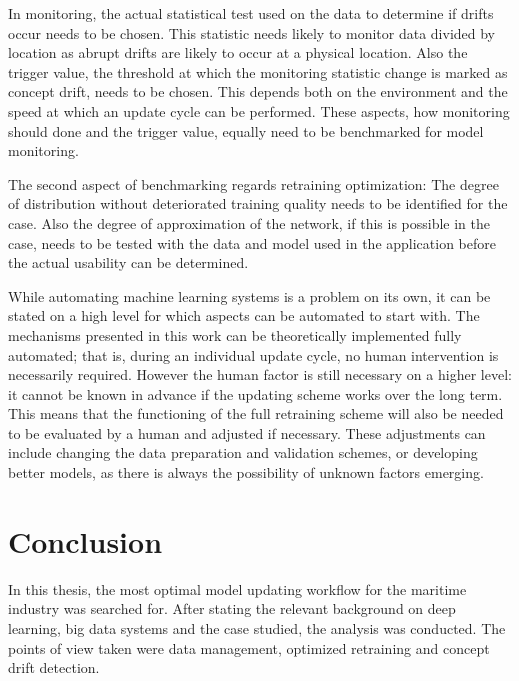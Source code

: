 In monitoring, the actual statistical test used on the data to determine if drifts occur needs to be chosen. This statistic needs likely to monitor data divided by location as abrupt drifts are likely to occur at a physical location. Also the trigger value, the threshold at which the monitoring statistic change is marked as concept drift, needs to be chosen. This depends both on the environment and the speed at which an update cycle can be performed. These aspects, how monitoring should done and the trigger value, equally need to be benchmarked for model monitoring.

The second aspect of benchmarking regards retraining optimization: The degree of distribution without deteriorated training quality needs to be identified for the case. Also the degree of approximation of the network, if this is possible in the case, needs to be tested with the data and model used in the application before the actual usability can be determined.

\enlargethispage{7mm}
While automating machine learning systems is a problem on its own, it can be stated on a high level for which aspects can be automated to start with. The mechanisms presented in this work can be theoretically implemented fully automated; that is, during an individual update cycle, no human intervention is necessarily required. However the human factor is still necessary on a higher level: it cannot be known in advance if the updating scheme works over the long term. This means that the functioning of the full retraining scheme will also be needed to be evaluated by a human and adjusted if necessary. These adjustments can include changing the data preparation and validation schemes, or developing better models, as there is always the possibility of unknown factors emerging.


\chapter{Conclusion}

In this thesis, the most optimal model updating workflow for the maritime industry was searched for. After stating the relevant background on deep learning, big data systems and the case studied, the analysis was conducted. The points of view taken were data management, optimized retraining and concept drift detection.

